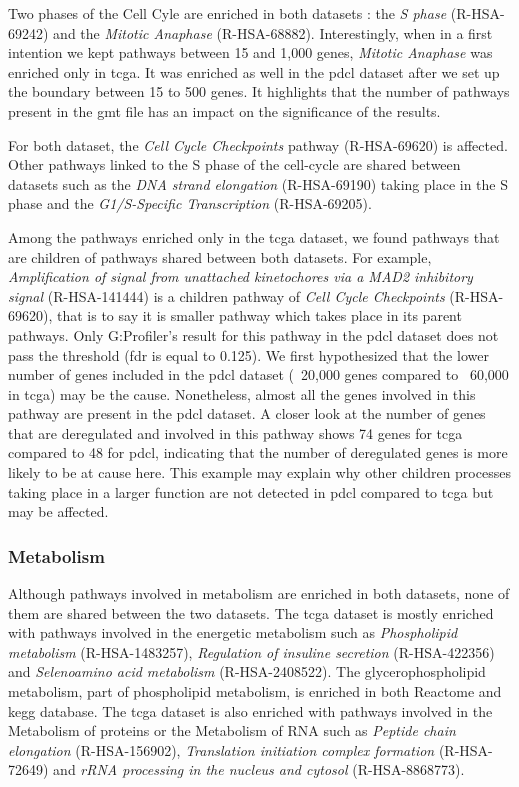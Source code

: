 Two phases of the Cell Cyle are enriched in both datasets : the \textit{S phase} (R-HSA-69242) and the \textit{Mitotic Anaphase} (R-HSA-68882).
Interestingly, when in a first intention we kept pathways between 15 and 1,000 genes, \textit{Mitotic Anaphase}  was enriched only in \acrshort{tcga}.
It was enriched as well in the \acrshort{pdcl} dataset after we set up the boundary between 15 to 500 genes.
It highlights that the number of pathways present in the \acrshort{gmt} file has an impact on the significance of the results.

For both dataset, the \textit{Cell Cycle Checkpoints} pathway (R-HSA-69620) is affected.
Other pathways linked to the S phase of the cell-cycle are shared between datasets such as the \textit{DNA strand elongation} (R-HSA-69190) taking place in the S phase and the \textit{G1/S-Specific Transcription} (R-HSA-69205).

Among the pathways enriched only in the \acrshort{tcga} dataset, we found pathways that are children of pathways shared between both datasets.
For example, \textit{Amplification of signal from unattached kinetochores via a MAD2 inhibitory signal} (R-HSA-141444) is a children pathway of \textit{Cell Cycle Checkpoints} (R-HSA-69620), that is to say it is smaller pathway which takes place in its parent pathways.
Only G:Profiler's result for this pathway in the \acrshort{pdcl} dataset does not pass the threshold (\acrshort{fdr} is equal to 0.125).
We first hypothesized that the lower number of genes included in the \acrshort{pdcl} dataset (~20,000 genes compared to ~60,000 in \acrshort{tcga}) may be the cause.
Nonetheless, almost all the genes involved in this pathway are present in the \acrshort{pdcl} dataset.
A closer look at the number of genes that are deregulated and involved in this pathway shows 74 genes for \acrshort{tcga} compared to 48 for \acrshort{pdcl}, indicating that the number of deregulated genes is more likely to be at cause here.
This example may explain why other children processes taking place in a larger function are not detected in \acrshort{pdcl} compared to \acrshort{tcga} but may be affected.

\subsubsection{Metabolism}

Although pathways involved in metabolism are enriched in both datasets, none of them are shared between the two datasets.
The \acrshort{tcga} dataset is mostly enriched with pathways involved in the energetic metabolism such as \textit{Phospholipid metabolism} (R-HSA-1483257), \textit{Regulation of insuline secretion} (R-HSA-422356) and \textit{Selenoamino acid metabolism} (R-HSA-2408522).
The glycerophospholipid metabolism, part of phospholipid metabolism, is enriched in both Reactome and \acrshort{kegg} database.
The \acrshort{tcga} dataset is also enriched with pathways involved in the Metabolism of proteins or the Metabolism of RNA such as \textit{Peptide chain elongation} (R-HSA-156902), \textit{Translation initiation complex formation} (R-HSA-72649) and \textit{rRNA processing in the nucleus and cytosol} (R-HSA-8868773).

